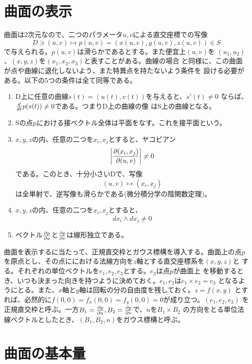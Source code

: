    \section{曲面の表示}
        曲面は2次元なので、二つのパラメータ$u,v$による直交座標での写像
            \[D\ni (u,v)\longmapsto p(u,v) = (x(u,v),y(u,v),z(u,v))\in S\]
        で与えられる。$p(u,v)$は滑らかであるとする。また便宜上$(u,v)$を
        $(u_1,u_2)$、$(x,y,z)$を$(x_1,x_2,x_3)$と表すことがある。曲線の場合
        と同様に、この曲面が点や曲線に退化しないよう、また特異点を持たないよう条件を
        設ける必要がある。以下の5つの条件は全て同等である。
        \begin{enumerate}
            \item D上に任意の曲線$s(t)=(u(t),v(t))$を与えると、$s'(t)\neq 0$
                  ならば、$\di{t}p(s(t))\neq 0$である。つまりD上の曲線の像
                  はS上の曲線となる。\\
            \item Sの点pにおける接ベクトル全体は平面をなす。これを接平面という。\\
            \item $x,y,z$の内、任意の二つを$x_i,x_j$とすると、ヤコビアン
                      \[\left|\pd[(x_i,x_j)]{(u,v)}\right|\neq 0\]
                  である。このとき、十分小さいDで、写像
                      \[(u,v)\longmapsto (x_i,x_j)\]
                  は全単射で、逆写像も滑らかである(微分積分学の陰関数定理)。
            \item $x,y,z$の内、任意の二つを$x_i,x_j$とすると、
                      \[dx_i\wedge dx_j\neq 0\]
            \item ベクトル$\pd[p]{u}$と$\pd[p]{v}$は線形独立である。
        \end{enumerate}
        曲面を表示するに当たって、正規直交枠とガウス標構を導入する。曲面上の点$p$
        を原点とし、その点ににおける法線方向を$z$軸とする直交座標系を$(x,y,z)$と
        する。それぞれの単位ベクトルを$e_1,e_2,e_3$とする。$e_3$は点$p$が曲面上
        を移動するとき、いつも決まった向きを持つように決めておく。$e_1,e_2$は$e_1\times e_2 = e_3$
        となるようにとる。また、$x$軸と$y$軸は回転の分の自由度を残しておく。$z=f(x,y)$
        とすれば、必然的に$f(0,0)=f_x(0,0)=f_y(0,0)=0$が成り立つ。$(e_1,e_2,e_3)$
        を正規直交枠と呼ぶ。一方$B_1=\pd[p]{u},B_2=\pd[p]{v}$で、$n$を$B_1\times B_2$
        の方向をとる単位法線ベクトルとしたとき、$(B_1,B_2,n)$をガウス標構と呼ぶ。


    \section{曲面の基本量}
